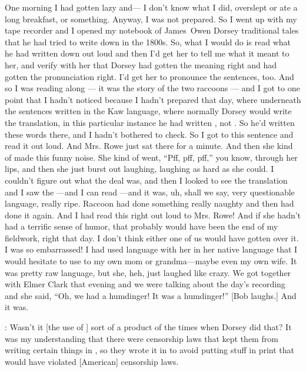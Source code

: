 \documentclass[output=paper]{LSP/langsci}
\begin{document}
One morning I had gotten lazy and--- I don't know what I did, overslept or ate a long breakfast, or something. Anyway, I was not prepared. So I went up with my tape recorder and I opened my notebook of James~Owen Dorsey traditional tales that he had tried to write down in the 1800s. So, what I would do is read what he had written down out loud and then I'd get her to tell me what it meant to her, and verify with her that Dorsey had gotten the meaning right and had gotten the pronunciation right. I'd get her to pronounce the sentences, too. And so I was reading along --- it was the story of the two raccoons --- and I got to one point that I hadn't noticed because I hadn't prepared that day, where underneath the sentences written in the Kaw language, where normally Dorsey would write the  translation, in this particular instance he had written , not . So he'd written these  words there, and I hadn't bothered to check. So I got to this sentence and read it out loud. And Mrs. Rowe just sat there for a minute. And then she kind of made this funny noise. She kind of went, ``Pff, pff, pff,'' you know, through her lips, and then she just burst out laughing, laughing as hard as she could. I couldn't figure out what the deal was, and then I looked to see the translation and I saw the ---and I can read ---and it was, uh, shall we say, very questionable language, really ripe. Raccoon had done something really naughty and then had done it again. And I had read this right out loud to Mrs. Rowe! And if she hadn't had a terrific sense of humor, that probably would have been the end of my fieldwork, right that day. I don't think either one of us would have gotten over it. I was so embarrassed! I had used language with her in her native language that I would hesitate to use to my own mom or grandma---maybe even my own wife. It was pretty raw language, but she, heh, just laughed like crazy. We got together with Elmer Clark that evening and we were talking about the day's recording and she said, ``Oh, we had a humdinger! It was a humdinger!'' [Bob laughs.] And it was.

: Wasn't it [the use of ] sort of a product of the times when Dorsey did that? It was my understanding that there were censorship laws that kept them from writing certain things in , so they wrote it in  to avoid putting stuff in print that would have violated [American] censorship laws.
\end{document}

